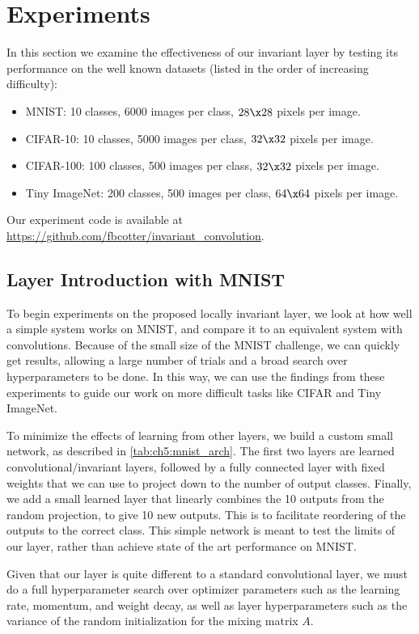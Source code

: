 \section{Experiments}\label{sec:experiments}
In this section we examine the effectiveness of our invariant layer by testing
its performance on the well known datasets (listed in the order of increasing
difficulty):
\begin{itemize}
  \item MNIST: 10 classes, 6000 images per class, $28\x 28$ pixels per image.
  \item CIFAR-10: 10 classes, 5000 images per class, $32\x 32$ pixels per image.
  \item CIFAR-100: 100 classes, 500 images per class, $32\x 32$ pixels per image. 
  \item Tiny ImageNet\cite{li_tiny_nodate}: 200 classes, 500 images per class, 
    $64 \x 64$ pixels per image. 
\end{itemize}
Our experiment code is available at
\url{https://github.com/fbcotter/invariant_convolution}.

\subsection{Layer Introduction with MNIST}\label{sec:ch5:mnist}
To begin experiments on the proposed locally invariant layer, we look at how
well a simple system works on MNIST, and compare it to an equivalent system with
convolutions. Because of the small size of the MNIST challenge, we can quickly
get results, allowing a large number of trials and a broad search over
hyperparameters to be done. In this way, we can use the findings from these
experiments to guide our work on more difficult tasks like CIFAR and Tiny
ImageNet.

To minimize the effects of learning from other layers, we build a
custom small network, as described in \autoref{tab:ch5:mnist_arch}. 
The first two layers are learned convolutional/invariant layers, followed by
a fully connected layer with fixed weights that we can use to project down to
the number of output classes. Finally, we add a small learned layer that
linearly combines the 10 outputs from the random projection, to give 10 new
outputs. This is to facilitate reordering of the outputs to the correct class.
This simple network is meant to test the limits of our layer, rather than
achieve state of the art performance on MNIST.

Given that our layer is quite different to a standard convolutional layer, we
must do a full hyperparameter search over optimizer parameters such as the
learning rate, momentum, and weight decay, as well as layer hyperparameters 
such as the variance of the random initialization for the mixing matrix $A$.

